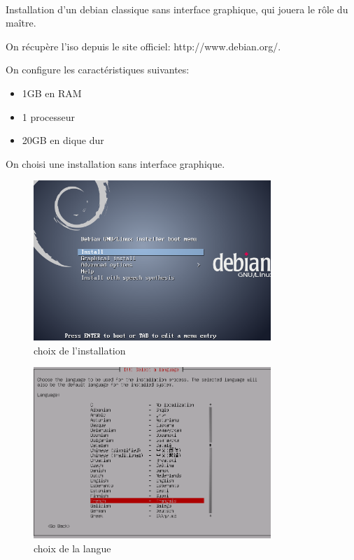 \documentclass[11pt,a4paper,titlepage, oneside]{article}
\begin{document}
	\paragraph{}
		Installation d'un debian classique sans interface graphique, qui jouera le rôle du maître.
		
		On récupère l'iso depuis le site officiel: http://www.debian.org/.

		On configure les caractéristiques suivantes:
		\begin{itemize}
                        \item{1GB en RAM}
                        \item{1 processeur}
                        \item{20GB en dique dur}
        \end{itemize}
 		
		On choisi une installation sans interface graphique.
			
		 \begin{figure}[h]
                        \centering
                        \includegraphics[width=0.8\textwidth,natwidth=310,natheight=242]{images/debian1.png}
                        \caption{choix de l'installation}
    	    \end{figure}
		
		\begin{figure}[htp]
                        \centering
                        \includegraphics[width=0.8\textwidth,natwidth=310,natheight=242]{images/debian2.png}
                        \caption{choix de la langue}
		\end{figure}
	
\end{document}
